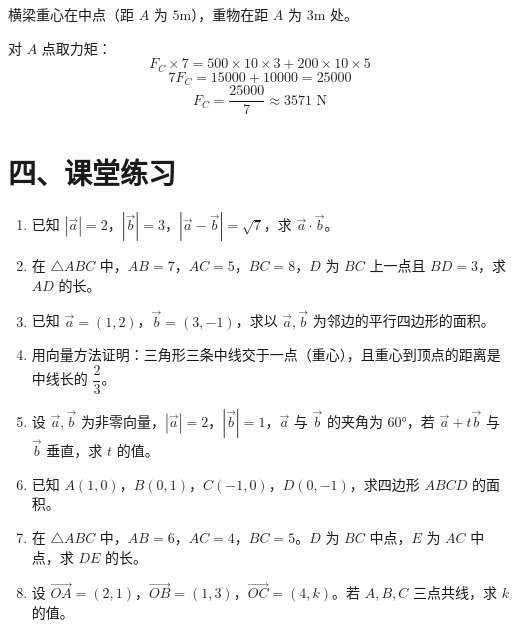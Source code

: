 \documentclass[12pt, a4paper]{ctexart}
\begin{document}
横梁重心在中点（距 $A$ 为 $5$m），重物在距 $A$ 为 $3$m 处。

对 $A$ 点取力矩：
\[
F_C \times 7 = 500 \times 10 \times 3 + 200 \times 10 \times 5
\]
\[
7F_C = 15000 + 10000 = 25000
\]
\[
F_C = \frac{25000}{7} \approx 3571 \text{ N}
\]

\section*{\textcolor{tipgreen}{四、课堂练习}}

\begin{enumerate}
\item 已知 $|\vec{a}|=2$，$|\vec{b}|=3$，$|\vec{a}-\vec{b}|=\sqrt{7}$，求 $\vec{a}\cdot\vec{b}$。

\item 在 $\triangle ABC$ 中，$AB=7$，$AC=5$，$BC=8$，$D$ 为 $BC$ 上一点且 $BD=3$，求 $AD$ 的长。

\item 已知 $\vec{a}=(1,2)$，$\vec{b}=(3,-1)$，求以 $\vec{a}, \vec{b}$ 为邻边的平行四边形的面积。

\item 用向量方法证明：三角形三条中线交于一点（重心），且重心到顶点的距离是中线长的 $\dfrac{2}{3}$。

\item 设 $\vec{a}, \vec{b}$ 为非零向量，$|\vec{a}|=2$，$|\vec{b}|=1$，$\vec{a}$ 与 $\vec{b}$ 的夹角为 $60°$，若 $\vec{a}+t\vec{b}$ 与 $\vec{b}$ 垂直，求 $t$ 的值。

\item 已知 $A(1,0)$，$B(0,1)$，$C(-1,0)$，$D(0,-1)$，求四边形 $ABCD$ 的面积。

\item 在 $\triangle ABC$ 中，$AB=6$，$AC=4$，$BC=5$。$D$ 为 $BC$ 中点，$E$ 为 $AC$ 中点，求 $DE$ 的长。

\item 设 $\overrightarrow{OA}=(2,1)$，$\overrightarrow{OB}=(1,3)$，$\overrightarrow{OC}=(4,k)$。若 $A, B, C$ 三点共线，求 $k$ 的值。
\end{enumerate}
\end{document}
